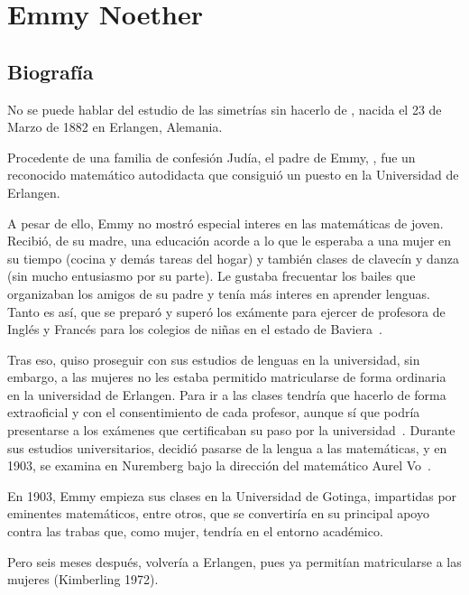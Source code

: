 \chapter{Emmy Noether}\label{ch:emmy-noether}

\section{Biografía}\label{sec:biografia}

No se puede hablar del estudio de las simetrías sin hacerlo de , nacida el 23 de Marzo de 1882 en Erlangen, Alemania.

Procedente de una familia de confesión Judía, el padre de Emmy, , fue un reconocido matemático autodidacta que consiguió un puesto en la Universidad de Erlangen.

A pesar de ello, Emmy no mostró especial interes en las matemáticas de joven.
Recibió, de su madre, una educación acorde a lo que le esperaba a una mujer en su tiempo (cocina y demás tareas del hogar) y también clases de clavecín y danza (sin mucho entusiasmo por su parte).
Le gustaba frecuentar los bailes que organizaban los amigos de su padre y tenía más interes en aprender lenguas.
Tanto es así, que se preparó y superó los exámente para ejercer de profesora de Inglés y Francés para los colegios de niñas en el estado de Baviera~\autocite{Carrasco}.

Tras eso, quiso proseguir con sus estudios de lenguas en la universidad, sin embargo, a las mujeres no les estaba permitido matricularse de forma ordinaria en la universidad de Erlangen.
Para ir a las clases tendría que hacerlo de forma extraoficial y con el consentimiento de cada profesor, aunque sí que podría presentarse a los exámenes que certificaban su paso por la universidad~\autocite{Kimberling}.
Durante sus estudios universitarios, decidió pasarse de la lengua a las matemáticas, y en 1903, se examina en Nuremberg bajo la dirección del matemático Aurel Vo\beta~\autocite{Kimberling}.

En 1903, Emmy empieza sus clases en la Universidad de Gotinga, impartidas por eminentes matemáticos, entre otros,  que se convertiría en su principal apoyo contra las trabas que, como mujer, tendría en el entorno académico.

Pero seis meses después, volvería a Erlangen, pues ya permitían matricularse a las mujeres (Kimberling 1972).

